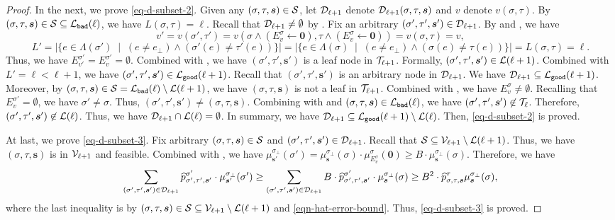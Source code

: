 \documentclass[11pt]{article}
\newcommand{\abs}[1]{\left\vert#1\right\vert}
\renewcommand{\mid}{\;\middle\vert\;} \newcommand{\cmid}{\,:\,}
\def\!#1{\mathtt{#1}}
\newcommand{\zero}{\boldsymbol{0}}
\newcommand{\seqS}{\boldsymbol{s}}
\begin{document}
\begin{proof}
In the next, we prove \eqref{eq-d-subset-2}.
Given any $(\sigma,\tau,\seqS)\in \+S$, let $\mathcal{D}_{\ell+1}$ denote 
$\+D_{\ell+1}(\sigma,\tau,\seqS)$ and $v$ denote $v(\sigma,\tau)$.
By $(\sigma,\tau,\seqS)\in \+S \subseteq \+L_{\!{bad}}(\ell)$,
we have $L(\sigma,\tau) = \ell$. Recall that $\mathcal{D}_{\ell+1}\neq \emptyset$ by .
Fix an arbitrary $(\sigma',\tau',\seqS')\in \+D_{\ell+1}$.
By  and ,
we have 
\[v' = v(\sigma',\tau')= v(\sigma \land (E^{\sigma}_v \gets \boldsymbol{0}),\tau \land (E^{\sigma}_v \gets \boldsymbol{0}))=v(\sigma,\tau)=v,\]
\[L' = \abs{\{e\in \Lambda(\sigma')\mid (e\neq e_{\bot})\land (\sigma'(e)\neq \tau'(e))\}} = \abs{\{e\in \Lambda(\sigma)\mid (e\neq e_{\bot})\land (\sigma(e)\neq \tau(e))\}} = L(\sigma,\tau) = \ell.\]
Thus, we have
$E^{\sigma'}_{v'} =E^{\sigma'}_{v} = \emptyset$.
Combined with ,
we have  $(\sigma',\tau',\seqS')$ is a leaf node in $\mathcal{T}_{\ell+1}$.
Formally, $(\sigma',\tau',\seqS')\in \+L(\ell+1)$.
Combined with $L'=\ell<\ell+1$, we have 
$(\sigma',\tau',\seqS') \in \+L_{\!{good}}(\ell+1)$.
Recall that $(\sigma',\tau',\seqS')$ is an arbitrary node in $\mathcal{D}_{\ell+1}$.
We have $\+D_{\ell+1}\subseteq \+L_{\!{good}}(\ell+1)$.
Moreover, by $(\sigma,\tau,\seqS)\in 
\+S = \+L_{\!{bad}}(\ell)\setminus \+L(\ell+1)$,
we have $(\sigma,\tau,\seqS)$ is not a leaf in $\mathcal{T}_{\ell+1}$.
Combined with , we have 
$E^{\sigma}_{v} \neq \emptyset$.
Recalling that $E^{\sigma'}_{v} = \emptyset$,
we have $\sigma'\neq \sigma$.
Thus, $(\sigma',\tau',\seqS') \neq (\sigma,\tau,\seqS)$.
Combining with  and $(\sigma,\tau,\seqS)\in \+L_{\!{bad}}(\ell)$,
we have $(\sigma',\tau',\seqS')\not \in \+T_{\ell}$.
Therefore, $(\sigma',\tau',\seqS')\not\in  \+L(\ell)$.
Thus, we have $\mathcal{D}_{\ell+1}\cap \mathcal{L}(\ell) = \emptyset$.
In summary, we have
$\+D_{\ell+1}\subseteq \+L_{\!{good}}(\ell+1)\setminus \+L(\ell)$.
Then, \eqref{eq-d-subset-2} is proved.

At last, we prove \eqref{eq-d-subset-3}.
Fix arbitrary $(\sigma,\tau,\seqS) \in \+S$ and  $(\sigma',\tau',\seqS')\in \+D_{\ell+1}$. 
Recall that $\mathcal{S} \subseteq  \mathcal{V}_{\ell+1}\setminus \mathcal{L}(\ell+1)$.
Thus, we have $(\sigma,\tau,\seqS)$ is in $\mathcal{V}_{\ell+1}$ and feasible.
Combined with ,
we have 
$\mu^{\sigma_{\bot}}_{\seqS'}(\sigma') = \mu^{\sigma_{\bot}}_{\seqS}(\sigma)\cdot \mu_{E_v^\sigma}^{\sigma}(\zero) \ge B\cdot\mu^{\sigma_{\bot}}_{\seqS}(\sigma)$.
Therefore, we have 
\begin{align*}
\sum_{(\sigma',\tau',\seqS')\in \+D_{\ell+1}} \widehat{p}^{\sigma'}_{\sigma',\tau',\seqS'}\cdot \mu^{\sigma_{\bot}}_{\seqS'}(\sigma') 
\geq \sum_{(\sigma',\tau',\seqS')\in \+D_{\ell+1}} B\cdot\widehat{p}^{\sigma'}_{\sigma',\tau',\seqS'}\cdot \mu^{\sigma_{\bot}}_{\seqS}(\sigma) \geq B^2 \cdot \widehat{p}^{\tau}_{\sigma,\tau,\seqS}\mu^{\sigma_{\bot}}_{\seqS}(\sigma),
\end{align*}
where the last inequality is by $(\sigma,\tau,\seqS) \in \+S\subseteq  \+V_{\ell+1}\setminus \+L(\ell+1)$ and \eqref{eqn-hat-error-bound}. Thus, \eqref{eq-d-subset-3} is proved.

\end{proof}
\end{document}
